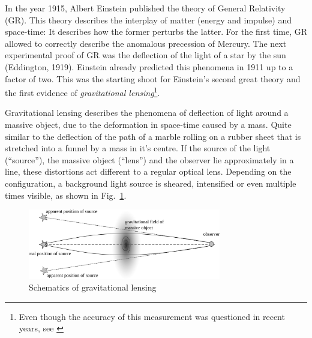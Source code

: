 \documentclass[11pt]{article}
\begin{document}
In the year 1915, Albert Einstein published the theory of General Relativity (GR).
This theory describes the interplay of matter (energy and impulse) and space-time: It describes how the former perturbs the latter.
For the first time, GR allowed to correctly describe the anomalous precession of Mercury.
The next experimental proof of GR was the deflection of the light of a star by the sun (Eddington, 1919).
Einstein already predicted this phenomena in 1911 up to a factor of two.
This was the starting shoot for Einstein’s second great theory and the first evidence of \emph{gravitational lensing}\footnote{Even though the accuracy of this measurement was questioned in recent years, see \cite{kennefick2009testing}}.

Gravitational lensing describes the phenomena of deflection of light around a massive object, due to the deformation in space-time caused by a mass.
Quite similar to the deflection of the path of a marble rolling on a rubber sheet that is stretched into a funnel by a mass in it's centre.
If the source of the light (``source''), the massive object (``lens'') and the observer lie approximately in a line, these distortions act different to a regular optical lens.
Depending on the configuration, a background light source is sheared, intensified or even multiple times visible, as shown in Fig.~\ref{fig:grav_lens}.

\begin{figure}[ht]
	\centering
		\includegraphics[width=0.75\textwidth]{img/grav_lens}
	\caption{Schematics of gravitational lensing}
	\label{fig:grav_lens}
\end{figure}
\end{document}
